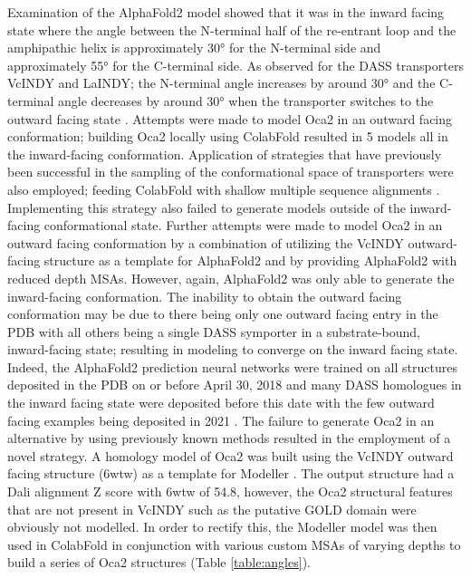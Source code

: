 Examination of the AlphaFold2 model showed that it was in the inward facing state where the angle between the N-terminal half of the re-entrant loop and the amphipathic helix is approximately 30° for the N-terminal side and approximately 55° for the C-terminal side. As observed for the DASS transporters VcINDY and LaINDY; the N-terminal angle increases by around 30° and the C-terminal angle decreases by around 30° when the transporter switches to the outward facing state \cite{sauer2021structure}. 
Attempts were made to model Oca2 in an outward facing conformation; building Oca2 locally using ColabFold resulted in 5 models all in the inward-facing conformation.  Application of strategies that have previously been successful in the sampling of the conformational space of transporters were also employed; feeding ColabFold with shallow multiple sequence alignments \cite{del2022sampling}.  Implementing this strategy also failed to generate models outside of the inward-facing conformational state.  Further attempts  were made to model Oca2 in an outward facing conformation by a combination of utilizing the VcINDY outward-facing structure as a template for AlphaFold2 \cite{mirdita2021colabfold} and by providing AlphaFold2 with  reduced depth MSAs.  However, again, AlphaFold2 was only able to generate the inward-facing conformation.  The inability to obtain the outward facing conformation may be due to there being only one outward facing entry in the PDB with all others being a single DASS symporter in a substrate-bound, inward-facing state; resulting in modeling to converge on the inward facing state. Indeed, the AlphaFold2 prediction neural networks were trained on all structures deposited in the PDB on or before April 30, 2018 \cite{Jumper2021} and many DASS homologues in the inward facing state were deposited before this date with the few outward facing examples being deposited in 2021 \cite{sauer2021structure}.  
The failure to generate Oca2 in an alternative by using previously known methods resulted in the employment of a novel strategy. A homology model of Oca2 was built using the VcINDY outward facing structure (6wtw) as a template for Modeller \cite{eswar2006comparative}.  The output structure had a Dali alignment Z score with 6wtw of 54.8, however, the Oca2 structural features that are not present in VcINDY such as the putative GOLD domain were obviously not modelled.  In order to rectify this, the Modeller model was then used in ColabFold in conjunction with various custom MSAs of varying depths to build a series of Oca2 structures (Table \ref{table:angles}). 


